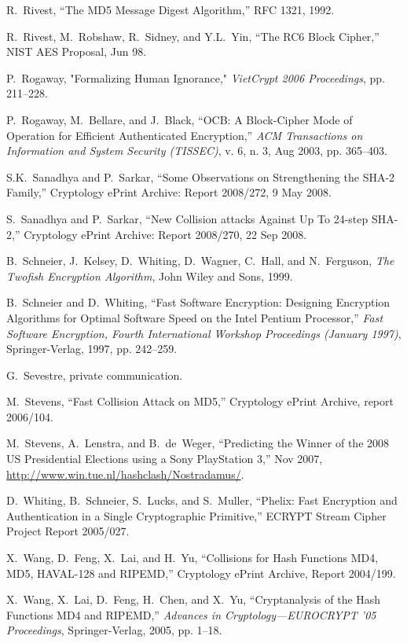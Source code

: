 \documentclass[11pt,twoside]{article}
\begin{document}
{\begin{thebibliography}{19}
 R.~Rivest, ``The MD5 Message Digest Algorithm,'' RFC 1321, 1992.

 R.~Rivest, M.~Robshaw, R.~Sidney, and Y.L.~Yin, ``The RC6 Block Cipher,'' NIST AES Proposal, Jun 98.

 P.~Rogaway, "Formalizing Human Ignorance," {\it VietCrypt 2006 Proceedings}, pp. 211--228.

 P.~Rogaway, M.~Bellare, and J.~Black, ``OCB: A Block-Cipher Mode of Operation for Efficient Authenticated Encryption,'' {\it ACM Transactions on Information and System Security (TISSEC)}, v. 6, n. 3, Aug 2003, pp. 365--403.

 S.K.~Sanadhya and P.~Sarkar, ``Some Observations on Strengthening the SHA-2 Family,'' Cryptology ePrint Archive: Report 2008/272, 9 May 2008.

 S.~Sanadhya and P.~Sarkar, ``New Collision attacks Against Up To 24-step SHA-2,'' Cryptology ePrint Archive: Report 2008/270, 22 Sep 2008.

 B.~Schneier, J.~Kelsey, D.~Whiting, D.~Wagner, C.~Hall, and N.~Ferguson, {\it The Twofish Encryption Algorithm}, John Wiley and Sons, 1999.

 B.~Schneier and D.~Whiting, ``Fast Software Encryption: Designing Encryption Algorithms for Optimal Software Speed on the Intel Pentium Processor,'' {\it Fast Software Encryption, Fourth International Workshop Proceedings (January 1997)}, Springer-Verlag, 1997, pp. 242--259.

 G.~Sevestre, private communication.

 M.~Stevens, ``Fast Collision Attack on MD5,'' Cryptology ePrint Archive, report 2006/104.

 M.~Stevens, A.~Lenstra, and B.~de~Weger, ``Predicting the Winner of the 2008 US Presidential Elections using a Sony PlayStation 3,'' Nov 2007, \url{http://www.win.tue.nl/hashclash/Nostradamus/}.

 D.~Whiting, B.~Schneier, S.~Lucks, and S.~Muller, ``Phelix: Fast Encryption and Authentication in a Single Cryptographic Primitive,'' ECRYPT Stream Cipher Project Report 2005/027.

 X.~Wang, D.~Feng, X.~Lai, and H.~Yu, ``Collisions for Hash Functions MD4, MD5, HAVAL-128 and RIPEMD,'' Cryptology ePrint Archive, Report 2004/199.

 X.~Wang, X.~Lai, D.~Feng, H.~Chen, and X.~Yu, ``Cryptanalysis of the Hash Functions MD4 and RIPEMD,'' {\it Advances in Cryptology---EUROCRYPT '05 Proceedings}, Springer-Verlag, 2005, pp. 1--18.


\end{thebibliography}}
\end{document}
